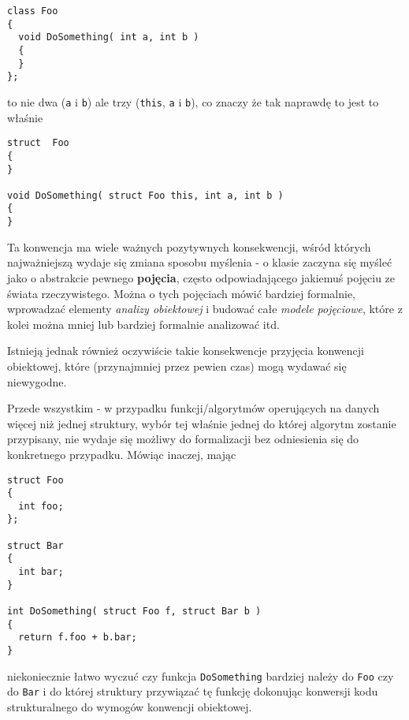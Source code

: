 \begin{scriptsize}
\begin{verbatim}
class Foo
{
  void DoSomething( int a, int b ) 
  {
  }
};
\end{verbatim}
\end{scriptsize}

to nie dwa ({\tt a} i {\tt b}) ale trzy ({\tt this}, {\tt a} i {\tt b}), co znaczy że tak naprawdę to jest to właśnie

\begin{scriptsize}
\begin{verbatim}
struct  Foo
{
}

void DoSomething( struct Foo this, int a, int b ) 
{
}
\end{verbatim}
\end{scriptsize}

Ta konwencja ma wiele ważnych pozytywnych konsekwencji, wśród których najważniejszą wydaje się zmiana sposobu
myślenia - o klasie zaczyna się myśleć jako o abstrakcie pewnego {\bf pojęcia}, często odpowiadającego
jakiemuś pojęciu ze świata rzeczywistego. Można o tych pojęciach mówić bardziej formalnie, wprowadzać elementy
{\em analizy obiektowej} i budować całe {\em modele pojęciowe}, które z kolei można mniej lub bardziej formalnie 
analizować itd.

Istnieją jednak również oczywiście takie konsekwencje przyjęcia konwencji obiektowej, które 
(przynajmniej przez pewien czas) mogą wydawać się niewygodne. 

Przede wszystkim - w przypadku funkcji/algorytmów operujących na danych więcej niż jednej struktury,
wybór tej właśnie jednej do której algorytm zostanie przypisany, nie wydaje się możliwy do formalizacji bez odniesienia
się do konkretnego przypadku. Mówiąc inaczej, mając

\begin{scriptsize}
\begin{verbatim}
struct Foo
{
  int foo;
};

struct Bar
{
  int bar;
}

int DoSomething( struct Foo f, struct Bar b ) 
{
  return f.foo + b.bar; 
}
\end{verbatim}
\end{scriptsize}

niekoniecznie łatwo wyczuć czy funkcja {\tt DoSomething} bardziej należy do {\tt Foo} czy do {\tt Bar} i do której struktury
przywiązać tę funkcję dokonując konwersji kodu strukturalnego do wymogów konwencji obiektowej.

